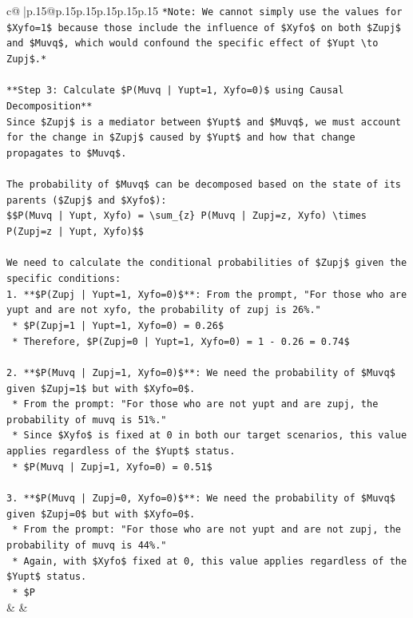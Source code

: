 \documentclass{article}
\begin{document}
{\begin{supertabular}{c@{$\;$}|p{.15\linewidth}@{}p{.15\linewidth}p{.15\linewidth}p{.15\linewidth}p{.15\linewidth}p{.15\linewidth}}
{{{\texttt{*Note: We cannot simply use the values for \$Xyfo=1\$ because those include the influence of \$Xyfo\$ on both \$Zupj\$ and \$Muvq\$, which would confound the specific effect of \$Yupt \textbackslash{}to Zupj\$.*} \\
\\ 
\texttt{**Step 3: Calculate \$P(Muvq | Yupt=1, Xyfo=0)\$ using Causal Decomposition**} \\
\texttt{Since \$Zupj\$ is a mediator between \$Yupt\$ and \$Muvq\$, we must account for the change in \$Zupj\$ caused by \$Yupt\$ and how that change propagates to \$Muvq\$.} \\
\\ 
\texttt{The probability of \$Muvq\$ can be decomposed based on the state of its parents (\$Zupj\$ and \$Xyfo\$):} \\
\texttt{\$\$P(Muvq | Yupt, Xyfo) = \textbackslash{}sum\_\{z\} P(Muvq | Zupj=z, Xyfo) \textbackslash{}times P(Zupj=z | Yupt, Xyfo)\$\$} \\
\\ 
\texttt{We need to calculate the conditional probabilities of \$Zupj\$ given the specific conditions:} \\
\texttt{1.  **\$P(Zupj | Yupt=1, Xyfo=0)\$**: From the prompt, "For those who are yupt and are not xyfo, the probability of zupj is 26\%."} \\
\texttt{    *   \$P(Zupj=1 | Yupt=1, Xyfo=0) = 0.26\$} \\
\texttt{    *   Therefore, \$P(Zupj=0 | Yupt=1, Xyfo=0) = 1 {-} 0.26 = 0.74\$} \\
\\ 
\texttt{2.  **\$P(Muvq | Zupj=1, Xyfo=0)\$**: We need the probability of \$Muvq\$ given \$Zupj=1\$ but with \$Xyfo=0\$.} \\
\texttt{    *   From the prompt: "For those who are not yupt and are zupj, the probability of muvq is 51\%."} \\
\texttt{    *   Since \$Xyfo\$ is fixed at 0 in both our target scenarios, this value applies regardless of the \$Yupt\$ status.} \\
\texttt{    *   \$P(Muvq | Zupj=1, Xyfo=0) = 0.51\$} \\
\\ 
\texttt{3.  **\$P(Muvq | Zupj=0, Xyfo=0)\$**: We need the probability of \$Muvq\$ given \$Zupj=0\$ but with \$Xyfo=0\$.} \\
\texttt{    *   From the prompt: "For those who are not yupt and are not zupj, the probability of muvq is 44\%."} \\
\texttt{    *   Again, with \$Xyfo\$ fixed at 0, this value applies regardless of the \$Yupt\$ status.} \\
\texttt{    *   \$P} \\
            }
        }
    }
    & & \\ \\


\end{supertabular}}
\end{document}
